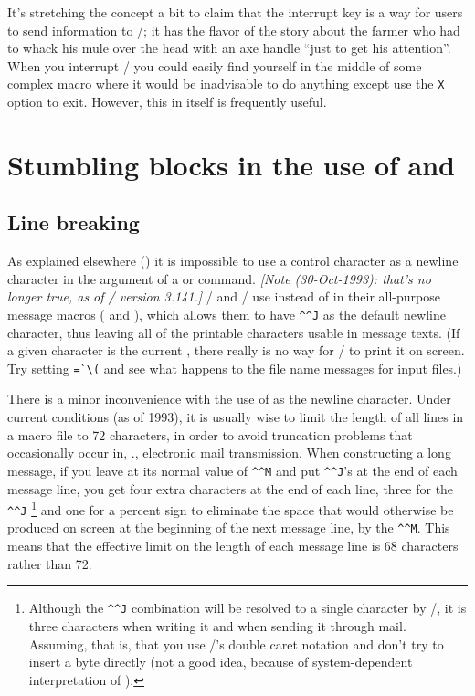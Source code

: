 {It's stretching the concept a bit to claim that the interrupt key is
a way for users to send information to \tex/; it  has the flavor of the
story about the farmer who had to whack his mule over the head with
an axe handle ``just to get his attention''.  When you interrupt
\tex/ you could easily find yourself in the middle of some
complex macro where it would be inadvisable to do anything except use
the \verb|X| option to exit. However, this in itself is frequently
useful.

\section{Stumbling blocks in the use of  and }
\label{s:stumblewrite}

\subsection{Line breaking}

As explained elsewhere () it is impossible to use a
control character as a newline character in the argument of a
 or  command.
{\em[Note (30-Oct-1993): that's no longer true, as of \tex/ version 3.141.]}
\latex/ and \amstex/
use  instead of  in their
all-purpose message macros ( and ), which allows
them to have \verb"^^J" as the default newline character,
thus leaving all of the printable characters usable in message texts.
(If a given character is the current , there really
is no way for \tex/ to  print it on screen. Try setting
\verb|=`\(| and see what happens to the file name
messages for input files.)

There is a minor inconvenience with the use of  as the newline
character. Under current conditions (as of 1993), it is usually wise to
limit the length of all lines in a macro file to 72 characters, in
order to avoid truncation problems that occasionally occur in, \eg.,
electronic mail transmission. When constructing a long message, if you
leave  at its normal value of \verb;^^M; and put
\verb;^^J;'s at the end of each message line, you get four extra
characters at the end of each line, three for the \verb;^^J;%
\footnote{Although the {\tt\string ^\string ^J} combination will be
resolved to a single character by \tex/, it is three characters when
writing it and when sending it through mail.  Assuming, that is, that
you use \tex/'s double caret notation and don't try to insert a
 byte directly (not a good idea, because of system-dependent
interpretation of ).}
and one for a percent sign to eliminate the space that would otherwise
be produced on screen at the beginning of the next message line, by the
\verb;^^M;. This means that the effective limit on the length of each
message line is 68 characters rather than 72.

}
